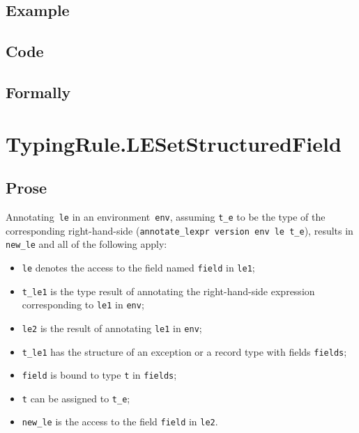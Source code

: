 \documentclass{book}
\begin{document}
  \subsection{Example}

  \subsection{Code}

\begin{emptyformal}
    \subsection{Formally}
\end{emptyformal}


\section{TypingRule.LESetStructuredField \label{sec:TypingRule.LESetStructuredField}}

    \subsection{Prose}
   Annotating~\texttt{le} in an environment~\texttt{env}, assuming
\texttt{t\_e} to be the type of the corresponding right-hand-side
(\texttt{annotate\_lexpr version env le t\_e}), results in \texttt{new\_le} and
all of the following apply:
   \begin{itemize}
   \item \texttt{le} denotes the access to the field named \texttt{field} in \texttt{le1};
   \item \texttt{t\_le1} is the type result of annotating the right-hand-side expression corresponding to \texttt{le1} in \texttt{env};
   \item \texttt{le2} is the result of annotating \texttt{le1} in \texttt{env};
   \item \texttt{t\_le1} has the structure of an exception or a record type with fields \texttt{fields};
   \item \texttt{field} is bound to type \texttt{t} in \texttt{fields};
   \item \texttt{t} can be assigned to \texttt{t\_e}; 
   \item \texttt{new\_le} is the access to the field \texttt{field} in \texttt{le2}.
   \end{itemize}
\end{document}
